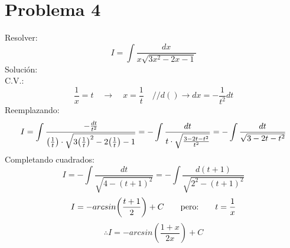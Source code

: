 \section{Problema 4}
Resolver:
\[I=\int \frac{dx}{x \sqrt{3x^2-2x-1}}\]
Solución: \\
C.V.:
\[ \frac{1}{x}=t \quad \rightarrow \quad x=\frac{1}{t}\quad//d() \rightarrow dx=-\frac{1}{t^2}dt\]
Reemplazando:
\[I=\int \frac{-\frac{dt}{t^2}}{\qty (\frac{1}{t}) \cdot \sqrt{3\qty(\frac{1}{t})^2-2\qty(\frac{1}{t})-1}} = - \int \frac{dt}{t \cdot \sqrt{\frac{3-2t-t^2}{t^2}}} = - \int \frac{dt}{\sqrt{3-2t-t^2}}\]
Completando cuadrados:
\[I= - \int \frac{dt}{\sqrt{4-(t+1)^2}} = - \int \frac{d(t+1)}{\sqrt{2^2-(t+1)^2}}\]
\[I=-  arcsin \qty (\frac{t+1}{2})+C \qquad \text{pero:} \qquad t=\frac{1}{x} \]
\[\therefore I=- arcsin\left(\frac{1+x}{2x}\right)+C \] 
